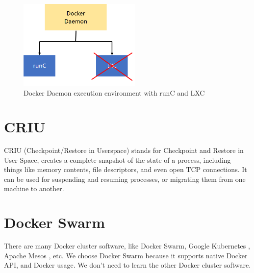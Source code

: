 \begin{figure}[h]
\begin{center}
\includegraphics[width=6cm]{figure/docker_LXC.png}
\end{center}
\caption{Docker Daemon execution environment with runC and LXC}
\label{fig:docker_LXC}
\end{figure}

\section{CRIU}
CRIU \cite{CRIU} (Checkpoint/Restore in Userspace) stands for Checkpoint and Restore in User Space, creates a complete snapshot of the state of a process, including things like memory contents, file descriptors, and even open TCP connections. It can be used for suspending and resuming processes, or migrating them from one machine to another.

\section{Docker Swarm}
There are many Docker cluster software, like Docker Swarm\cite{DockerSwarm}, Google Kubernetes \cite{bernstein2014containers}, Apache Mesos \cite{hindman2011mesos}, etc. We choose Docker Swarm because it supports native Docker API, and Docker usage. We don't need to learn the other Docker cluster software.

